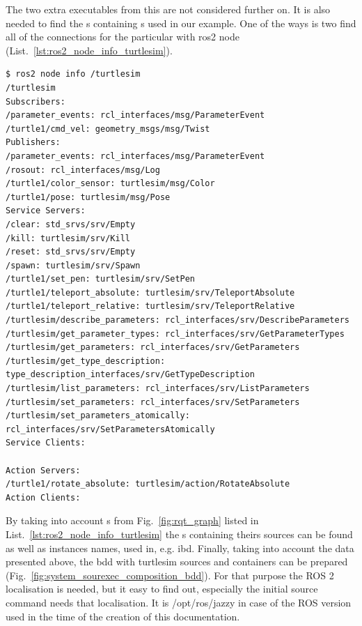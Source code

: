 \documentclass[11pt,oneside,a4paper]{report}
\begin{document}
The two extra executables from this \stPackage{} are not considered further on. It is also needed to find the \stPackage{}s containing \stRosConnection{}s used in our example. One of the ways is two find all of the connections for the particular \stNode{} with \textsf{ros2 node} \stCLTool{} (List.~\ref{lst:ros2_node_info_turtlesim}).


\begin{lstlisting}[style=terminal,label={lst:ros2_node_info_turtlesim},caption={ros2 node info /turtlesim}]
$ ros2 node info /turtlesim 
/turtlesim
Subscribers:
/parameter_events: rcl_interfaces/msg/ParameterEvent
/turtle1/cmd_vel: geometry_msgs/msg/Twist
Publishers:
/parameter_events: rcl_interfaces/msg/ParameterEvent
/rosout: rcl_interfaces/msg/Log
/turtle1/color_sensor: turtlesim/msg/Color
/turtle1/pose: turtlesim/msg/Pose
Service Servers:
/clear: std_srvs/srv/Empty
/kill: turtlesim/srv/Kill
/reset: std_srvs/srv/Empty
/spawn: turtlesim/srv/Spawn
/turtle1/set_pen: turtlesim/srv/SetPen
/turtle1/teleport_absolute: turtlesim/srv/TeleportAbsolute
/turtle1/teleport_relative: turtlesim/srv/TeleportRelative
/turtlesim/describe_parameters: rcl_interfaces/srv/DescribeParameters
/turtlesim/get_parameter_types: rcl_interfaces/srv/GetParameterTypes
/turtlesim/get_parameters: rcl_interfaces/srv/GetParameters
/turtlesim/get_type_description: type_description_interfaces/srv/GetTypeDescription
/turtlesim/list_parameters: rcl_interfaces/srv/ListParameters
/turtlesim/set_parameters: rcl_interfaces/srv/SetParameters
/turtlesim/set_parameters_atomically: rcl_interfaces/srv/SetParametersAtomically
Service Clients:

Action Servers:
/turtle1/rotate_absolute: turtlesim/action/RotateAbsolute
Action Clients:
\end{lstlisting}

By taking into account \stRosConnection{}s from Fig.~\ref{fig:rqt_graph} listed in List.~\ref{lst:ros2_node_info_turtlesim} the \stPackage{}s containing theirs sources can be found as well as 
instances names, used in, e.g. ibd. Finally, taking into account the data presented above, the bdd with \textsf{turtlesim} \stSystem{} sources and containers can be prepared (Fig.~\ref{fig:system_sourexec_composition_bdd}). For that purpose the ROS 2 \stWorkspace{} localisation is needed, but it easy to find out, especially the initial \textsf{source} command needs that localisation. It is  \textsf{/opt/ros/jazzy} in case of the ROS version used in the time of the creation of this documentation.
\end{document}
